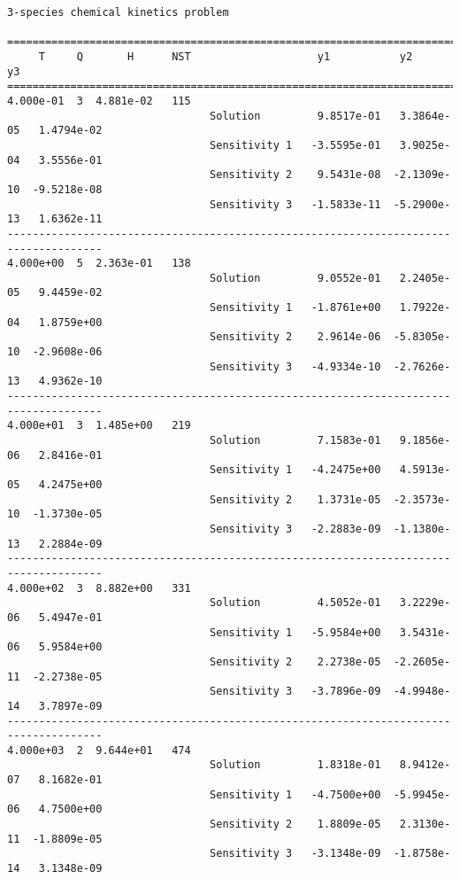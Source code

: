 \begin{verbatim}
3-species chemical kinetics problem

=====================================================================================
     T     Q       H      NST                    y1           y2           y3    
=====================================================================================
4.000e-01  3  4.881e-02   115
                                Solution         9.8517e-01   3.3864e-05   1.4794e-02 
                                Sensitivity 1   -3.5595e-01   3.9025e-04   3.5556e-01 
                                Sensitivity 2    9.5431e-08  -2.1309e-10  -9.5218e-08 
                                Sensitivity 3   -1.5833e-11  -5.2900e-13   1.6362e-11 
-------------------------------------------------------------------------------------
4.000e+00  5  2.363e-01   138
                                Solution         9.0552e-01   2.2405e-05   9.4459e-02 
                                Sensitivity 1   -1.8761e+00   1.7922e-04   1.8759e+00 
                                Sensitivity 2    2.9614e-06  -5.8305e-10  -2.9608e-06 
                                Sensitivity 3   -4.9334e-10  -2.7626e-13   4.9362e-10 
-------------------------------------------------------------------------------------
4.000e+01  3  1.485e+00   219
                                Solution         7.1583e-01   9.1856e-06   2.8416e-01 
                                Sensitivity 1   -4.2475e+00   4.5913e-05   4.2475e+00 
                                Sensitivity 2    1.3731e-05  -2.3573e-10  -1.3730e-05 
                                Sensitivity 3   -2.2883e-09  -1.1380e-13   2.2884e-09 
-------------------------------------------------------------------------------------
4.000e+02  3  8.882e+00   331
                                Solution         4.5052e-01   3.2229e-06   5.4947e-01 
                                Sensitivity 1   -5.9584e+00   3.5431e-06   5.9584e+00 
                                Sensitivity 2    2.2738e-05  -2.2605e-11  -2.2738e-05 
                                Sensitivity 3   -3.7896e-09  -4.9948e-14   3.7897e-09 
-------------------------------------------------------------------------------------
4.000e+03  2  9.644e+01   474
                                Solution         1.8318e-01   8.9412e-07   8.1682e-01 
                                Sensitivity 1   -4.7500e+00  -5.9945e-06   4.7500e+00 
                                Sensitivity 2    1.8809e-05   2.3130e-11  -1.8809e-05 
                                Sensitivity 3   -3.1348e-09  -1.8758e-14   3.1348e-09 

\end{verbatim}
